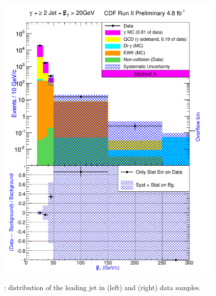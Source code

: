 \documentclass[11pt]{article}
\begin{document}
\begin{figure}[h!]
{ \includegraphics[scale=\resultsHistScale,keepaspectratio=true]{./g30jetmet20_MtdA_plot2_Met.pdf}
}
 \caption{: \met distribution of the leading jet in \phoonejetmettwenty (left) and \photwojetmettwenty (right) data samples.}
 \label{fig:Result_MtdA_gj1Met20_Met}
\end{figure}
\end{document}
